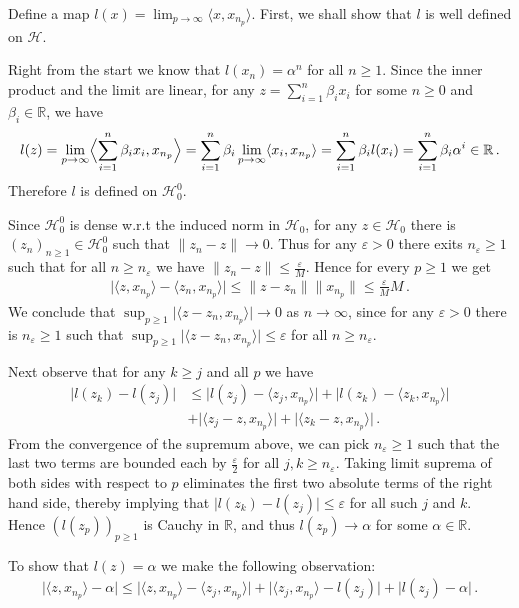 \documentclass[a4paper]{article}
\newcommand{\Hcal}{\mathcal{H}}
\newcommand{\real}{\mathbb{R}}
\begin{document}
Define a map $l(x) = \lim_{p\to \infty} \langle x, x_{n_p} \rangle$. First, we shall
show that $l$ is well defined on $\Hcal$.

Right from the start we know that $l(x_n) = \alpha^n$ for all $n\geq 1$. Since the
inner product and the limit are linear, for any $z = \sum_{i=1}^n \beta_i x_i$ for
some $n\geq 0$ and $\beta_i \in \real$, we have
\begin{equation*}
  l(z)
    = \lim_{p\to \infty} \Bigl \langle \sum_{i=1}^n \beta_i x_i, x_{n_p} \Bigr \rangle
    = \sum_{i=1}^n \beta_i \lim_{p\to \infty} \langle x_i, x_{n_p} \rangle
    = \sum_{i=1}^n \beta_i l(x_i)
    = \sum_{i=1}^n \beta_i \alpha^i
    \in \real
    \,.
\end{equation*}
Therefore $l$ is defined on $\Hcal^0_0$.

Since $\Hcal^0_0$ is dense w.r.t the induced norm in $\Hcal_0$, for any $z\in \Hcal_0$
there is $(z_n)_{n\geq1} \in \Hcal^0_0$ such that $\|z_n - z\|\to 0$. Thus for any
$\varepsilon > 0$ there exits $n_\varepsilon \geq 1$ such that for all $n\geq n_\varepsilon$
we have $\|z_n - z\| \leq \tfrac\varepsilon{M}$. Hence for every $p\geq 1$ we get
\begin{align*}
  \bigl\lvert \langle z, x_{n_p} \rangle -  \langle z_n, x_{n_p} \rangle \bigr\rvert
    \leq \| z - z_n \| \|x_{n_p} \|
    \leq \tfrac\varepsilon{M} M
    \,.
\end{align*}
We conclude that $\sup_{p\geq 1} \lvert \langle z - z_n, x_{n_p} \rangle \rvert \to 0$
as $n\to \infty$, since for any $\varepsilon > 0$ there is $n_\varepsilon \geq 1$ such
that $\sup_{p\geq 1} \lvert \langle z - z_n, x_{n_p} \rangle \rvert \leq \varepsilon$ for
all $n\geq n_\varepsilon$.

Next observe that for any $k \geq j$ and all $p$ we have
\begin{align*}
  \lvert l(z_k) - l(z_j) \rvert
    &\leq \lvert l(z_j) - \langle z_j, x_{n_p} \rangle \rvert
      + \lvert l(z_k) - \langle z_k, x_{n_p} \rangle \rvert
    \\
    &+ \lvert \langle z_j - z, x_{n_p} \rangle \rvert
      + \lvert \langle z_k - z, x_{n_p} \rangle \rvert
      \,.
\end{align*}
From the convergence of the supremum above, we can pick $n_\varepsilon \geq1$ such
that the last two terms are bounded each by $\tfrac\varepsilon2$ for all $j,k \geq
n_\varepsilon$. Taking limit suprema of both sides with respect to $p$ eliminates
the first two absolute terms of the right hand side, thereby implying that
$\lvert l(z_k) - l(z_j) \rvert\leq \varepsilon$ for all such $j$ and $k$. Hence
$(l(z_p))_{p\geq 1}$ is Cauchy in $\real$, and thus $l(z_p) \to \alpha$ for some
$\alpha \in \real$.

To show that $l(z) = \alpha$ we make the following observation:
\begin{align*}
  \lvert \langle z, x_{n_p} \rangle - \alpha \rvert
    \leq \lvert \langle z, x_{n_p} \rangle - \langle z_j, x_{n_p} \rangle \rvert
    + \lvert \langle z_j, x_{n_p} \rangle - l(z_j) \rvert
    + \lvert l(z_j) - \alpha \rvert
    \,.
\end{align*}

\end{document}
